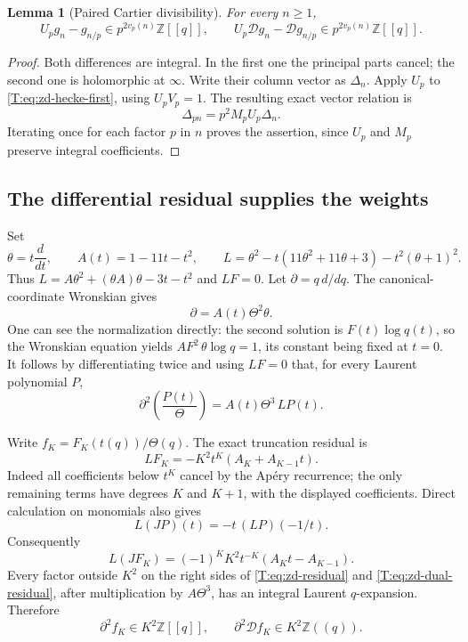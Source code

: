 \documentclass[11pt,a4paper]{article}
\newtheorem{lemma}[theorem]{Lemma}
\theoremstyle{definition}\newtheorem{definition}[theorem]{Definition}
\theoremstyle{remark}\newtheorem{remark}[theorem]{Remark}
\numberwithin{equation}{section}
\begin{document}
\begin{lemma}[Paired Cartier divisibility]
\label{T:lem:zd-paired-cartier}
For every \(n\ge1\),
\[
 U_pg_n-g_{n/p}\in
       p^{2v_p(n)}\mathbb Z[[q]],\qquad
 U_p\mathcal{D}g_n-\mathcal{D}g_{n/p}\in
       p^{2v_p(n)}\mathbb Z[[q]].
\]
\end{lemma}
\begin{proof}
Both differences are integral.  In the first one the principal
parts cancel; the second one is holomorphic at \(\infty\).
Write their column vector as \(\Delta_n\).
Apply \(U_p\) to \eqref{T:eq:zd-hecke-first}, using \(U_pV_p=1\).
The resulting exact vector relation is
\[
 \Delta_{pn}=p^2M_pU_p\Delta_n.
\]
Iterating once for each factor \(p\) in \(n\) proves the assertion,
since \(U_p\) and \(M_p\) preserve integral coefficients.
\end{proof}

\subsection{The differential residual supplies the weights}

Set
\[
 \theta=t\frac{d}{dt},\qquad
 A(t)=1-11t-t^2,\qquad
 L=\theta^2-t(11\theta^2+11\theta+3)-t^2(\theta+1)^2.
\]
Thus \(L=A\theta^2+(\theta A)\theta-3t-t^2\) and \(LF=0\).
Let \(\partial=q\,d/dq\).
The canonical-coordinate Wronskian gives
\[
 \partial=A(t)\Theta^2\theta.
\]
One can see the normalization directly: the second solution is
\(F(t)\log q(t)\), so the Wronskian equation yields
\(A F^2\,\theta\log q=1\), its constant being fixed at \(t=0\).
It follows by differentiating twice and using \(LF=0\) that,
for every Laurent polynomial \(P\),
\begin{equation}\label{T:eq:zd-bol}
 \partial^2\left(\frac{P(t)}{\Theta}\right)
       =A(t)\Theta^3\,LP(t).
\end{equation}

Write \(f_K=F_K(t(q))/\Theta(q)\).
The exact truncation residual is
\begin{equation}\label{T:eq:zd-residual}
 LF_K=-K^2t^K(A_K+A_{K-1}t).
\end{equation}
Indeed all coefficients below \(t^K\) cancel by the
Ap\'ery recurrence; the only remaining terms have degrees \(K\)
and \(K+1\), with the displayed coefficients.
Direct calculation on monomials also gives
\[
 L(JP)(t)=-t\,(LP)(-1/t).
\]
Consequently
\begin{equation}\label{T:eq:zd-dual-residual}
 L(JF_K)=(-1)^KK^2t^{-K}(A_Kt-A_{K-1}).
\end{equation}
Every factor outside \(K^2\) on the right sides of
\eqref{T:eq:zd-residual} and \eqref{T:eq:zd-dual-residual},
after multiplication by \(A\Theta^3\), has an integral
Laurent \(q\)-expansion.  Therefore
\begin{equation}\label{T:eq:zd-two-bol-integral}
 \partial^2 f_K\in K^2\mathbb Z[[q]],\qquad
 \partial^2\mathcal{D}f_K\in K^2\mathbb Z((q)).
\end{equation}
\end{document}
